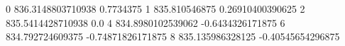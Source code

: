 0 836.3148803710938 0.7734375
1 835.810546875 0.26910400390625
2 835.5414428710938 0.0
4 834.8980102539062 -0.6434326171875
6 834.792724609375 -0.74871826171875
8 835.135986328125 -0.40545654296875
